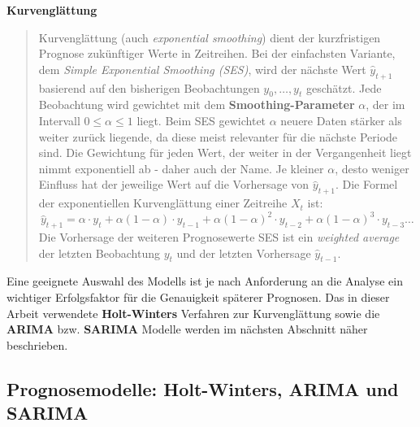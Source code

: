 \textbf{Kurvenglättung}
\begin{quotation}
Kurvenglättung (auch \textit{exponential smoothing}) dient der kurzfristigen Prognose zukünftiger Werte in Zeitreihen. Bei der einfachsten Variante, dem \textit{Simple Exponential Smoothing (SES)}, wird der nächste Wert $\hat{y}_{t+1}$ basierend auf den bisherigen Beobachtungen $y_0, \dots, y_t$ geschätzt. Jede Beobachtung wird gewichtet mit dem \textbf{Smoothing-Parameter} $\alpha$, der im Intervall $0 \leq \alpha \leq 1$ liegt. Beim SES gewichtet $\alpha$ neuere Daten stärker als weiter zurück liegende, da diese meist relevanter für die nächste Periode sind. Die Gewichtung für jeden Wert, der weiter in der Vergangenheit liegt nimmt exponentiell ab - daher auch der Name. Je kleiner $\alpha$, desto weniger Einfluss hat der jeweilige Wert auf die Vorhersage von $\hat{y}_{t+1}$. Die Formel der exponentiellen Kurvenglättung einer Zeitreihe $X_t$ ist:
\begin{equation}
    \hat{y}_{t+1}=\alpha \cdot y_t+\alpha(1-\alpha)\cdot y_{t-1}+\alpha(1-\alpha)^2\cdot y_{t-2}+\alpha(1-\alpha)^3\cdot y_{t-3}\dots
\end{equation}
Die Vorhersage der weiteren Prognosewerte SES ist ein \textit{weighted average} der letzten Beobachtung $y_t$ und der letzten Vorhersage $\hat{y}_{t-1}$. \cite{hyndman2018}
\end{quotation}

Eine geeignete Auswahl des Modells ist je nach Anforderung an die Analyse ein wichtiger Erfolgsfaktor für die Genauigkeit späterer Prognosen. Das in dieser Arbeit verwendete \textbf{Holt-Winters} Verfahren zur Kurvenglättung sowie die \textbf{ARIMA} bzw. \textbf{SARIMA} Modelle werden im nächsten Abschnitt näher beschrieben.


\subsection{Prognosemodelle: Holt-Winters, ARIMA und SARIMA}
\label{subsec:prognosemodelle}
